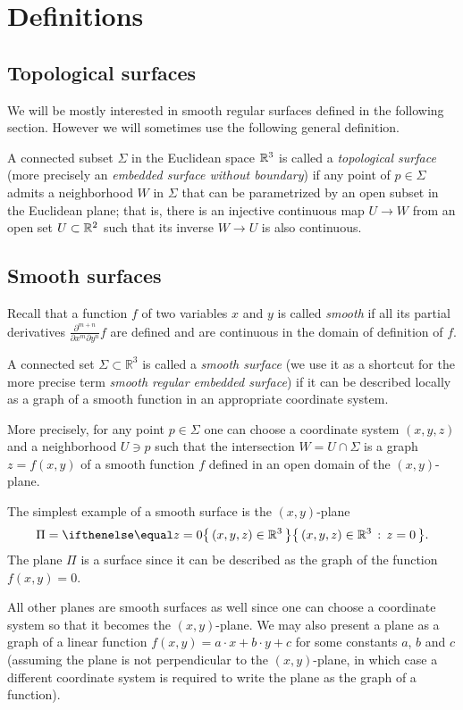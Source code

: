 \chapter{Definitions}

\section{Topological surfaces}

We will be mostly interested in smooth regular surfaces defined in the following section.
However we will sometimes use the following general definition.

A connected subset $\Sigma$ in the Euclidean space $\mathbb{R}^3$
is called a \emph{topological surface} (more precisely an {}\emph{embedded surface without boundary}) 
if any point of $p\in \Sigma$ admits a neighborhood $W$ in $\Sigma$ 
that can be parametrized by an open subset in the Euclidean plane; 
that is, there is an injective continuous map $U\to W$ from an open set $U\subset \mathbb{R}^2$ such that its inverse $W\to U$ is also continuous.


\section{Smooth surfaces}\label{sec:def-smooth-surface}

Recall that a function $f$ of two variables $x$ and $y$ is called \emph{smooth} if all its partial derivatives $\frac{\partial^{m+n}}{\partial x^m\partial y^n}f$ are defined and are continuous in the domain of definition of $f$. 

A connected set $\Sigma \subset \mathbb{R}^3$ is called a \emph{smooth surface} (we use it as a shortcut for the more precise term {}\emph{smooth regular embedded surface}) if it can be described locally as a graph of a smooth function in an appropriate coordinate system.

More precisely, for any point $p\in \Sigma$ one can choose a coordinate system $(x,y,z)$ and a neighborhood $U\ni p$ such that
the intersection $W=U\cap \Sigma$ is a graph $z=f(x,y)$ of a smooth function $f$ defined in an open domain of the $(x,y)$-plane.

The simplest example of a smooth surface is the $(x,y)$-plane 
\[\Pi=\set{(x,y,z)\in\RR^3}{z=0}.\]
The plane $\Pi$ is a surface since
it can be described as the graph of the function $f(x,y)=0$.

All other planes are smooth surfaces as well since one can choose a coordinate system so that it becomes the $(x,y)$-plane.
We may also present a plane as a graph of a linear function 
$f(x,y)=a\cdot x+b\cdot y+c$ for some constants $a$, $b$ and $c$
(assuming the plane is not perpendicular to the $(x,y)$-plane, in which case a different coordinate system is required to write the plane as the graph of a function).

